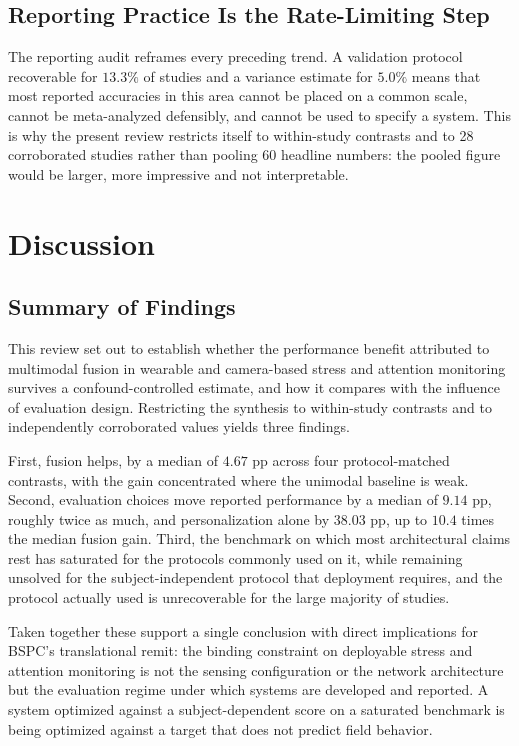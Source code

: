 \subsection{Reporting Practice Is the Rate-Limiting Step}
The reporting audit reframes every preceding trend. A validation protocol recoverable for
$13.3\%$ of studies and a variance estimate for $5.0\%$ means that most reported accuracies
in this area cannot be placed on a common scale, cannot be meta-analyzed defensibly, and
cannot be used to specify a system. This is why the present review restricts itself to
within-study contrasts and to 28 corroborated studies rather than pooling 60 headline
numbers: the pooled figure would be larger, more impressive and not interpretable.

\section{Discussion}

\subsection{Summary of Findings}
This review set out to establish whether the performance benefit attributed to multimodal
fusion in wearable and camera-based stress and attention monitoring survives a
confound-controlled estimate, and how it compares with the influence of evaluation design.
Restricting the synthesis to within-study contrasts and to independently corroborated values
yields three findings.

First, fusion helps, by a median of $4.67$ pp across four protocol-matched contrasts, with
the gain concentrated where the unimodal baseline is weak. Second, evaluation choices move
reported performance by a median of $9.14$ pp, roughly twice as much, and personalization
alone by $38.03$ pp, up to $10.4$ times the median fusion gain. Third, the benchmark on which
most architectural claims rest has saturated for the protocols commonly used on it, while
remaining unsolved for the subject-independent protocol that deployment requires, and the
protocol actually used is unrecoverable for the large majority of studies.

Taken together these support a single conclusion with direct implications for BSPC's
translational remit: the binding constraint on deployable stress and attention monitoring is
not the sensing configuration or the network architecture but the evaluation regime under
which systems are developed and reported. A system optimized against a subject-dependent
score on a saturated benchmark is being optimized against a target that does not predict
field behavior.

